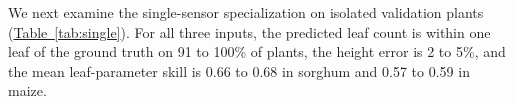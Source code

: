 \documentclass[10pt,twocolumn,letterpaper]{article}
\newcommand{\tabref}[1]{\hyperref[#1]{Table~\ref*{#1}}}
\begin{document}

We next examine the single-sensor specialization on isolated validation plants (\tabref{tab:single}). For all three inputs, the predicted leaf count is within one leaf of the ground truth on 91 to 100\% of plants, the height error is 2 to 5\%, and the mean leaf-parameter skill is 0.66 to 0.68 in sorghum and 0.57 to 0.59 in maize.
\end{document}
